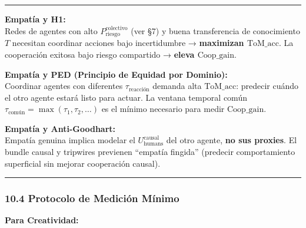 \begin{center}\rule{0.5\linewidth}{0.5pt}\end{center}

\textbf{Empatía y H1:}\\
Redes de agentes con alto \(P_{\text{riesgo}}^{\text{colectivo}}\) (ver
§7) y buena transferencia de conocimiento \(T\) necesitan coordinar
acciones bajo incertidumbre → \textbf{maximizan \(\text{ToM\_acc}\)}. La
cooperación exitosa bajo riesgo compartido → \textbf{eleva
\(\text{Coop\_gain}\)}.

\textbf{Empatía y PED (Principio de Equidad por Dominio):}\\
Coordinar agentes con diferentes \(\tau_{\text{reacción}}\) demanda alta
\(\text{ToM\_acc}\): predecir cuándo el otro agente estará listo para
actuar. La ventana temporal común
\(\tau_{\text{común}} = \max(\tau_1, \tau_2, \ldots)\) es el mínimo
necesario para medir \(\text{Coop\_gain}\).

\textbf{Empatía y Anti-Goodhart:}\\
Empatía genuina implica modelar el \(U_{\text{humans}}^{\text{causal}}\)
del otro agente, \textbf{no sus proxies}. El bundle causal y tripwires
previenen ``empatía fingida'' (predecir comportamiento superficial sin
mejorar cooperación causal).

\begin{center}\rule{0.5\linewidth}{0.5pt}\end{center}

\subsubsection{10.4 Protocolo de Medición
Mínimo}\label{protocolo-de-mediciuxf3n-muxednimo-1}

\textbf{Para Creatividad:}

